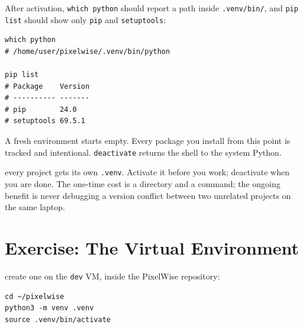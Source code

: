 After activation, \texttt{which python} should report a path inside
\texttt{.venv/bin/}, and \texttt{pip list} should show only \texttt{pip}
and \texttt{setuptools}:

\begin{verbatim}
which python
# /home/user/pixelwise/.venv/bin/python

pip list
# Package    Version
# ---------- -------
# pip        24.0
# setuptools 69.5.1
\end{verbatim}

A fresh environment starts empty.
Every package you install from this point is tracked and intentional.
\texttt{deactivate} returns the shell to the system Python.


 every project gets its own \texttt{.venv}.
Activate it before you work; deactivate when you are done.
The one-time cost is a directory and a command;
the ongoing benefit is never debugging a version conflict between two
unrelated projects on the same laptop.



\newpage
\section{Exercise: The Virtual Environment}

 create one on the
\texttt{dev} VM, inside the PixelWise repository:

\begin{verbatim}
cd ~/pixelwise
python3 -m venv .venv
source .venv/bin/activate
\end{verbatim}



